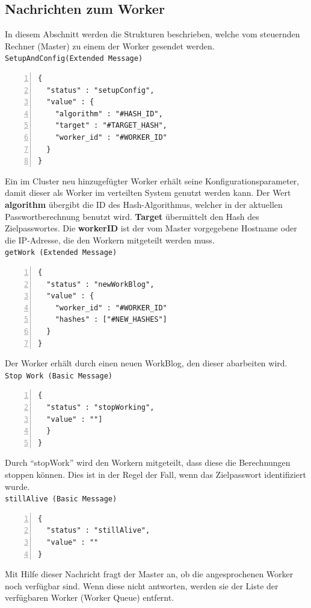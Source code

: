\subsection{Nachrichten zum Worker}
In diesem Abschnitt werden die Strukturen beschrieben, welche vom steuernden Rechner (Master) zu einem der Worker gesendet werden.\\

\texttt{SetupAndConfig(Extended Message)}
\begin{lstlisting}[basicstyle=\ttfamily,numbers=left,numberstyle=\footnotesize\ttfamily,backgroundcolor=\color{sourcegray}]
{
  "status" : "setupConfig",
  "value" : {
    "algorithm" : "#HASH_ID",
    "target" : "#TARGET_HASH", 
    "worker_id" : "#WORKER_ID"
  }
}
\end{lstlisting}
Ein im Cluster neu hinzugefügter Worker erhält seine Konfigurationsparameter, damit dieser als Worker im verteilten System genutzt werden kann. 
Der Wert \textbf{algorithm} übergibt die ID des Hash-Algorithmus, welcher in der aktuellen Passwortberechnung benutzt wird. \textbf{Target} übermittelt den Hash des Zielpasswortes. Die \textbf{workerID} ist der vom Master vorgegebene Hostname oder die IP-Adresse, die den Workern mitgeteilt werden muss.\\

\texttt{getWork (Extended Message)}
\begin{lstlisting}[basicstyle=\ttfamily,numbers=left,numberstyle=\footnotesize\ttfamily,backgroundcolor=\color{sourcegray}]
{
  "status" : "newWorkBlog",
  "value" : {
    "worker_id" : "#WORKER_ID"
    "hashes" : ["#NEW_HASHES"]
  }
}
\end{lstlisting}
Der Worker erhält durch einen neuen WorkBlog, den dieser abarbeiten wird.\\

\texttt{Stop Work (Basic Message)}
\begin{lstlisting}[basicstyle=\ttfamily,numbers=left,numberstyle=\footnotesize\ttfamily,backgroundcolor=\color{sourcegray}]
{
  "status" : "stopWorking",
  "value" : ""]
  }
}
\end{lstlisting}
Durch \enquote{stopWork} wird den Workern mitgeteilt, dass diese die Berechnungen stoppen können. Dies ist in der Regel der Fall, wenn das Zielpasswort identifiziert wurde. \\


\texttt{stillAlive (Basic Message)}
\begin{lstlisting}[basicstyle=\ttfamily,numbers=left,numberstyle=\footnotesize\ttfamily,backgroundcolor=\color{sourcegray}]
{
  "status" : "stillAlive",
  "value" : ""
}
\end{lstlisting}
Mit Hilfe dieser Nachricht fragt der Master an, ob die angesprochenen Worker noch verfügbar sind. Wenn diese nicht antworten, werden sie der Liste der verfügbaren Worker (Worker Queue) entfernt. 


